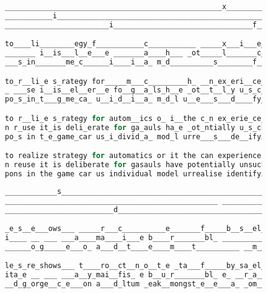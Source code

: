 \documentclass{article} \usepackage{iclr2022_conference,times}
\begin{document}
\begin{figure}[H]
\centering
\begin{minipage}{.999\textwidth}
\begin{lstlisting}[language=java]
__________________________________________________x___________________________________________
___________i___________________________________________________________________________n______
________________________i________________________________f____

to____li________egy_f___________c___________ _____x___i___e________rt s___k________________r i
_______ i__is___l__e___e _______a____h___ _ot_____l_______c_e__pr______ __j___ __er_t_onal_w_a
___s_in_______me_c______i____i__a_ m_d__________s________f____

to_r__li_e s_rategy for_____m___c_________h_ __n_ex_eri__ce______hort s_rike____b_r__wheth_r i
_ ___se i__is__el__er__e fo__g__a_ls_h__e _ot__t__l_y u_s_c_e__pr______ i_je__ __erational w_a
po_s_in_t___g_me_ca_ u__i_d__i__a_ m_d_l u__e___s___d____fy__g

to r__li_e s_rategy for autom__ics o_ i__the c_n ex_erie_ce_fo_ short s_rike_bombers_wheth_r i
n r_use it_is deli_erate for ga_auls ha_e _ot_ntially u_s_cke__pro_f___ i_ject __erational w_a
po_s in t_e_game_car us_i_divid_a_ mod_l urre___s___de__ifyi_g

to realize strategy for automatics or it the can experience for short strike bombers whether i
n reuse it is deliberate for gasauls have potentially unsucked proof or inject operational wea
pons in the game car us individual model urrealise identifying
\end{lstlisting}
\end{minipage}
\begin{minipage}{.999\textwidth}
\begin{lstlisting}[language=java]
____________s__________________________________________________________________________________
_________________________________________________ _________________t______________________t____
_________________________d__________________________________

_e_s__e___ows___ _____r___c__________e_______f_____b__s__el_i__ ____d__________s___c________he_
i____ __ ___ ___a____ma____i___e b____r_______bl_ __________d______t_n_a___ i_land__omp___t__n_
______o_g_____e___o_ a___d__t____e____m____t__________ __m__

le_s_re_shows___ t____ro__ct__n_o__t_e _ta___f_____by_sa_el_i_e _o_rd______ro__s __c_ _en__ he_
ita_e __ ___ ___a__y_mai__fis_ e b__u_r_______bl_ e_ __r_a__d_n_a__tin_a__s i_land_comp__it_on_
__d_g_orge__c_e___on a___d_ltum _eak__mongst_e__e___a_ _om__


\end{lstlisting}
\end{minipage}
\end{figure}
\end{document}
